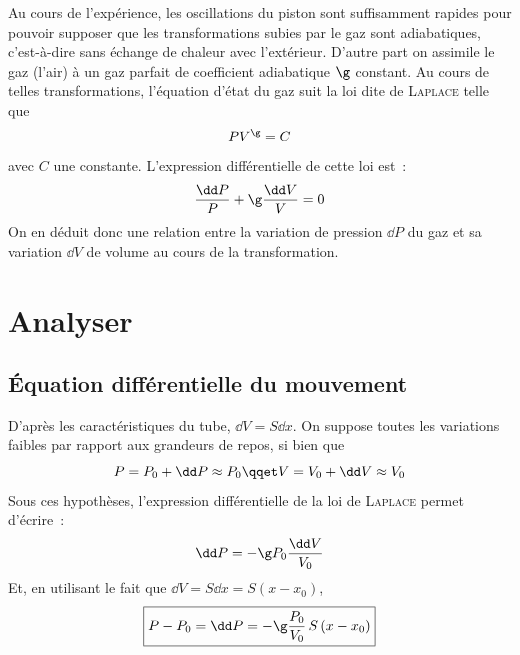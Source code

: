 \documentclass[../main/main.tex]{subfiles}
\begin{document}
{	Au cours de l'expérience, les oscillations du piston sont suffisamment rapides
	pour pouvoir supposer que les transformations subies par le gaz sont
	adiabatiques, c'est-à-dire sans échange de chaleur avec l'extérieur. D'autre
	part on assimile le gaz (l'air) à un gaz parfait de coefficient adiabatique $\g$
	constant. Au cours de telles transformations, l'équation d'état du gaz suit la
	loi dite de \textsc{Laplace} telle que
	\[
		PV^\g = C
	\]
	avec $C$ une constante. L'expression différentielle de cette loi est~:
	\[
		\frac{\dd P}{P} + \g \frac{\dd V}{V} = 0
	\]
	On en déduit donc une relation entre la variation de pression $\dd P$ du gaz et
	sa variation $\dd V$ de volume au cours de la transformation.
}

\setcounter{section}{2}
\section{Analyser}
\subsection{Équation différentielle du mouvement}

D'après les caractéristiques du tube, $\dd V=S \dd x$. On suppose toutes les
variations faibles par rapport aux grandeurs de repos, si bien que
\[
	P = P_0 +\dd P \approx P_0 \qqet V = V_0 +\dd V \approx V_0
\]
Sous ces hypothèses, l'expression différentielle de la loi de \textsc{Laplace}
permet d'écrire~:
\[
	\dd P = -\g P_0 \frac{\dd V}{V_0}
\]
Et, en utilisant le fait que $\dd V = S \dd x = S (x-x_0)$,
\[
	\boxed{P-P_0 = \dd P = - \g \frac{P_0}{V_0} \, S \, (x-x_0)}
\]


\end{document}
